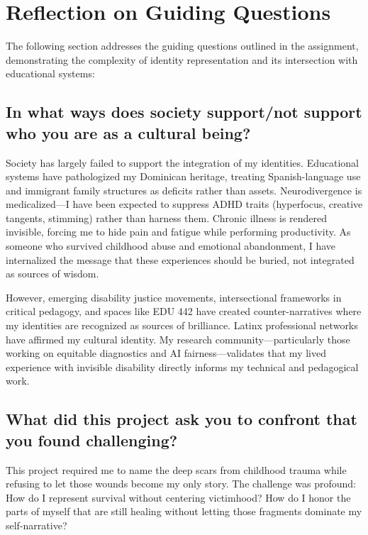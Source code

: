\documentclass[10pt]{article}
\begin{document}

\section*{Reflection on Guiding Questions}

The following section addresses the guiding questions outlined in the assignment, demonstrating the complexity of identity representation and its intersection with educational systems:

\subsection*{In what ways does society support/not support who you are as a cultural being?}

Society has largely failed to support the integration of my identities. Educational systems have pathologized my Dominican heritage, treating Spanish-language use and immigrant family structures as deficits rather than assets. Neurodivergence is medicalized---I have been expected to suppress ADHD traits (hyperfocus, creative tangents, stimming) rather than harness them. Chronic illness is rendered invisible, forcing me to hide pain and fatigue while performing productivity. As someone who survived childhood abuse and emotional abandonment, I have internalized the message that these experiences should be buried, not integrated as sources of wisdom.

However, emerging disability justice movements, intersectional frameworks in critical pedagogy, and spaces like EDU 442 have created counter-narratives where my identities are recognized as sources of brilliance. Latinx professional networks have affirmed my cultural identity. My research community---particularly those working on equitable diagnostics and AI fairness---validates that my lived experience with invisible disability directly informs my technical and pedagogical work.

\subsection*{What did this project ask you to confront that you found challenging?}

This project required me to name the deep scars from childhood trauma while refusing to let those wounds become my only story. The challenge was profound: How do I represent survival without centering victimhood? How do I honor the parts of myself that are still healing without letting those fragments dominate my self-narrative?
\end{document}
